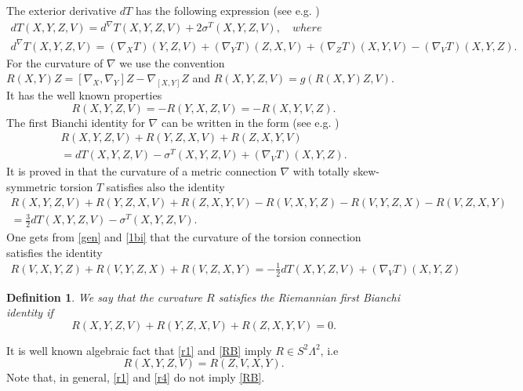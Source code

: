 \documentclass[10pt,british]{article}
\newtheorem{dfn}[thrm]{Definition}
\def\sb {{\nabla}}
\begin{document}
The exterior derivative $dT$ has the following  expression (see e.g. \cite{I,IP2,FI})
\begin{equation}\label{dh}
\begin{split}
dT(X,Y,Z,V)=d^{\sb}T(X,Y,Z,V) +2\sigma^T(X,Y,Z,V), \quad where\\
d^{\sb}T(X,Y,Z,V)=(\nabla_XT)(Y,Z,V)+(\nabla_YT)(Z,X,V)+(\nabla_ZT)(X,Y,V)-(\nabla_VT)(X,Y,Z).
 \end{split}
 \end{equation}
 For the curvature of $\sb$ we use the convention $ R(X,Y)Z=[\nabla_X,\nabla_Y]Z -
 \nabla_{[X,Y]}Z$ and $ R(X,Y,Z,V)=g(R(X,Y)Z,V)$. It has the well known properties
 \begin{equation}\label{r1}
 R(X,Y,Z,V)=-R(Y,X,Z,V)=-R(X,Y,V,Z).
 \end{equation}
  The first Bianchi identity for $\nabla$ can be written in the form (see e.g. \cite{I,IP2,FI})
 \begin{equation}\label{1bi}
 \begin{split}
 R(X,Y,Z,V)+ R(Y,Z,X,V)+ R(Z,X,Y,V)\\ 
 =dT(X,Y,Z,V)-\sigma^T(X,Y,Z,V)+(\nabla_VT)(X,Y,Z).
 \end{split}
 \end{equation}
It is proved in \cite[p. 307]{FI} that the curvature of  a metric connection $\sb$ with totally skew-symmetric torsion $T$  satisfies also the  identity
 \begin{equation}\label{gen}
 \begin{split}
 R(X,Y,Z,V)+ R(Y,Z,X,V)+ R(Z,X,Y,V)-R(V,X,Y,Z)-R(V,Y,Z,X)-R(V,Z,X,Y)\\
 =\frac32dT(X,Y,Z,V)-\sigma^T(X,Y,Z,V).
 \end{split}
 \end{equation}
 One gets from \eqref{gen} and \eqref{1bi} that the curvature of the torsion connection satisfies the identity 
 \begin{equation}\label{1bi1}
 \begin{split}
R(V,X,Y,Z)+R(V,Y,Z,X)+R(V,Z,X,Y)= -\frac12dT(X,Y,Z,V)+(\nabla_VT)(X,Y,Z)%
 \end{split}
 \end{equation}
 \begin{dfn} We say that the curvature $R$ satisfies the Riemannian first Bianchi identity if 
\begin{equation}\label{RB}
R(X,Y,Z,V)+R(Y,Z,X,V)+R(Z,X,Y,V)=0.
\end{equation}
\end{dfn}
 It is well known algebraic fact that \eqref{r1} and \eqref{RB} imply $R\in S^2\Lambda^2$, i.e 
 \begin{equation}\label{r4}
 R(X,Y,Z,V)=R(Z,V,X,Y).
 \end{equation}
 Note that, in general, \eqref{r1} and \eqref{r4} do not imply \eqref{RB}.
\end{document}
